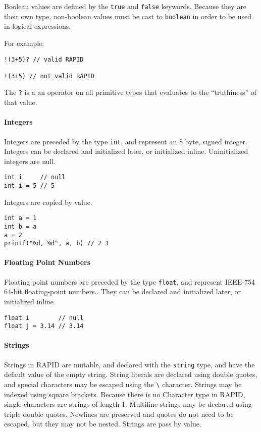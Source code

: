 \documentclass[]{article}
\begin{document}
Boolean values are defined by the \texttt{true} and \texttt{false}
keywords. Because they are their own type, non-boolean values must be
cast to \texttt{boolean} in order to be used in logical expressions.

For example:

\begin{verbatim}
!(3+5)? // valid RAPID

!(3+5) // not valid RAPID
\end{verbatim}

The \texttt{?} is a an operator on all primitive types that evaluates to
the ``truthiness'' of that value.

\paragraph{Integers}\label{integers}

Integers are preceded by the type \texttt{int}, and represent an 8 byte,
signed integer. Integers can be declared and initialized later, or
initialized inline. Uninitialized integers are null.

\begin{verbatim}
int i     // null
int i = 5 // 5
\end{verbatim}

Integers are copied by value.

\begin{verbatim}
int a = 1
int b = a
a = 2
printf("%d, %d", a, b) // 2 1
\end{verbatim}

\paragraph{Floating Point Numbers}\label{floating-point-numbers}

Floating point numbers are preceded by the type \texttt{float}, and
represent IEEE-754 64-bit floating-point numbers.. They can be declared
and initialized later, or initialized inline.

\begin{verbatim}
float i        // null
float j = 3.14 // 3.14
\end{verbatim}

\paragraph{Strings}\label{strings}

Strings in RAPID are mutable, and declared with the \texttt{string}
type, and have the default value of the empty string. String literals
are declared using double quotes, and special characters may be escaped
using the \texttt{\textbackslash{}} character. Strings may be indexed
using square brackets. Because there is no Character type in RAPID,
single characters are strings of length 1. Multiline strings may be
declared using triple double quotes. Newlines are preserved and quotes
do not need to be escaped, but they may not be nested. Strings are pass
by value.
\end{document}
